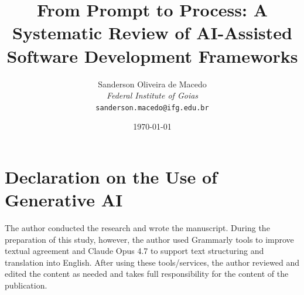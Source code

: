 \documentclass[11pt,a4paper]{article}
\title{From Prompt to Process: A Systematic Review of AI-Assisted Software Development Frameworks}
\author{Sanderson Oliveira de Macedo\\
\textit{Federal Institute of Goias}\\
\texttt{sanderson.macedo@ifg.edu.br}}
\date{\today}
\begin{document}
\maketitle













\section*{Declaration on the Use of Generative AI}

The author conducted the research and wrote the manuscript. During the preparation of this study, however, the author used Grammarly tools to improve textual agreement and Claude Opus 4.7 to support text structuring and translation into English. After using these tools/services, the author reviewed and edited the content as needed and takes full responsibility for the content of the publication.



\end{document}
